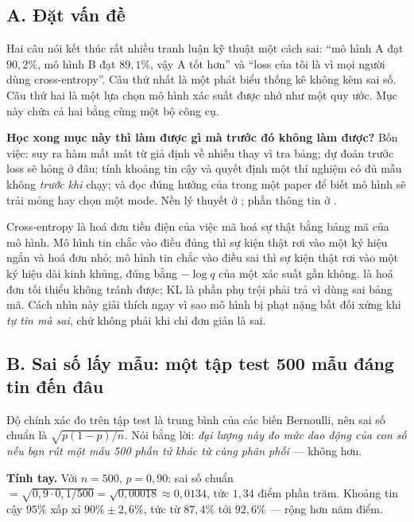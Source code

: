 \documentclass[../../../deep_learning.tex]{subfiles}
\begin{document}
\subsection{A. Đặt vấn đề}
Hai câu nói kết thúc rất nhiều tranh luận kỹ thuật một cách sai: ``mô hình A đạt \(90{,}2\%\), mô hình B đạt \(89{,}1\%\), vậy A tốt hơn'' và ``loss của tôi là  vì mọi người dùng cross-entropy''. Câu thứ nhất là một phát biểu thống kê không kèm sai số. Câu thứ hai là một lựa chọn mô hình xác suất được nhớ như một quy ước. Mục này chữa cả hai bằng cùng một bộ công cụ.

\textbf{Học xong mục này thì làm được gì mà trước đó không làm được?} Bốn việc: suy ra hàm mất mát từ giả định về nhiễu thay vì tra bảng; dự đoán trước loss sẽ hỏng ở đâu; tính khoảng tin cậy và quyết định một thí nghiệm có đủ mẫu không \emph{trước khi} chạy; và đọc đúng hướng của  trong một paper để biết mô hình sẽ trải mỏng hay chọn một mode. Nền lý thuyết ở \cite{murphy2022,bishop2006}; phần thông tin ở \cite{cover2006}.

\begin{trucgiac}
Cross-entropy là hoá đơn tiền điện của việc mã hoá sự thật bằng bảng mã của mô hình. Mô hình tin chắc vào điều đúng thì sự kiện thật rơi vào một ký hiệu ngắn và hoá đơn nhỏ; mô hình tin chắc vào điều sai thì sự kiện thật rơi vào một ký hiệu dài kinh khủng, đúng bằng \(-\log q\) của một xác suất gần không.  là hoá đơn tối thiểu không tránh được; KL là phần phụ trội phải trả vì dùng sai bảng mã. Cách nhìn này giải thích ngay vì sao mô hình bị phạt nặng bất đối xứng khi \emph{tự tin mà sai}, chứ không phải khi chỉ đơn giản là sai.
\end{trucgiac}

\subsection{B. Sai số lấy mẫu: một tập test 500 mẫu đáng tin đến đâu}
Độ chính xác đo trên tập test là trung bình của các biến Bernoulli, nên sai số chuẩn là \(\sqrt{p(1-p)/n}\). Nói bằng lời: \emph{đại lượng này đo mức dao động của con số nếu bạn rút một mẫu 500 phần tử khác từ cùng phân phối} --- không hơn.

\textbf{Tính tay.} Với \(n=500\), \(p=0{,}90\): sai số chuẩn \(=\sqrt{0{,}9\cdot 0{,}1/500}=\sqrt{0{,}00018}\approx 0{,}0134\), tức \(1{,}34\) điểm phần trăm. Khoảng tin cậy \(95\%\) xấp xỉ \(90\% \pm 2{,}6\%\), tức từ \(87{,}4\%\) tới \(92{,}6\%\) --- rộng hơn năm điểm.
\end{document}
